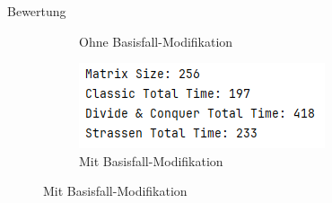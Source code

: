 \documentclass{beamer}
\begin{document}
\begin{frame}{Bewertung}
{{\begin{figure}[H]
\begin{subfigure}[b]{0.4\textwidth}
                \caption{Ohne Basisfall-Modifikation}
            \end{subfigure}
            \begin{subfigure}[b]{0.4\textwidth}
                \includegraphics[width=\textwidth]{256With.PNG}
                \caption{Mit Basisfall-Modifikation}
            \end{subfigure}
        \end{figure}
    }
    }{
    
}
\end{frame}
\end{document}

